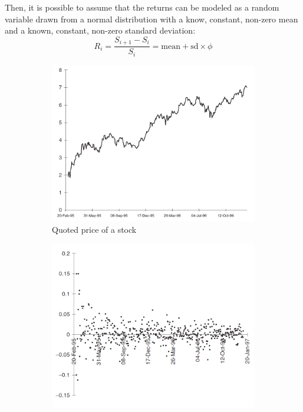 Then, it is possible to assume that the returns can be modeled as a random variable drawn from a normal distribution with a know, constant, non-zero mean and a known, constant, non-zero standard deviation:
\begin{equation}
    R_i = \frac{S_{i+1} - S_i}{S_i} = \text{mean} + \text{sd} \times \phi
\end{equation}

\begin{figure}[H]
    \centering
    \begin{subfigure}[b]{0.3\textwidth}
        \includegraphics[width=\textwidth]{figure/daily_return_1.png}
        \caption{Quoted price of a stock}
    \end{subfigure}
    \begin{subfigure}[b]{0.3\textwidth}
        \includegraphics[width=\textwidth]{figure/daily_return_2.png}

\end{subfigure}
\end{figure}
